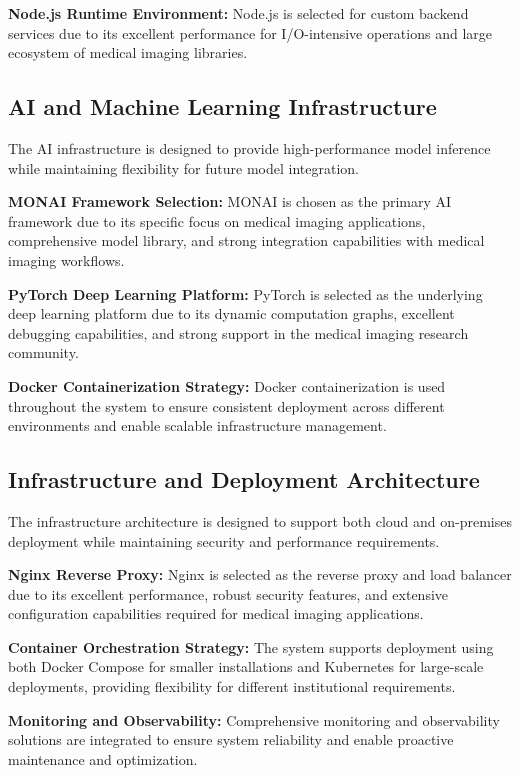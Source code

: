 \textbf{Node.js Runtime Environment:} Node.js is selected for custom backend services due to its excellent performance for I/O-intensive operations and large ecosystem of medical imaging libraries.

\subsection{AI and Machine Learning Infrastructure}

The AI infrastructure is designed to provide high-performance model inference while maintaining flexibility for future model integration.

\textbf{MONAI Framework Selection:} MONAI is chosen as the primary AI framework due to its specific focus on medical imaging applications, comprehensive model library, and strong integration capabilities with medical imaging workflows.

\textbf{PyTorch Deep Learning Platform:} PyTorch is selected as the underlying deep learning platform due to its dynamic computation graphs, excellent debugging capabilities, and strong support in the medical imaging research community.

\textbf{Docker Containerization Strategy:} Docker containerization is used throughout the system to ensure consistent deployment across different environments and enable scalable infrastructure management.

\subsection{Infrastructure and Deployment Architecture}

The infrastructure architecture is designed to support both cloud and on-premises deployment while maintaining security and performance requirements.

\textbf{Nginx Reverse Proxy:} Nginx is selected as the reverse proxy and load balancer due to its excellent performance, robust security features, and extensive configuration capabilities required for medical imaging applications.

\textbf{Container Orchestration Strategy:} The system supports deployment using both Docker Compose for smaller installations and Kubernetes for large-scale deployments, providing flexibility for different institutional requirements.

\textbf{Monitoring and Observability:} Comprehensive monitoring and observability solutions are integrated to ensure system reliability and enable proactive maintenance and optimization. 